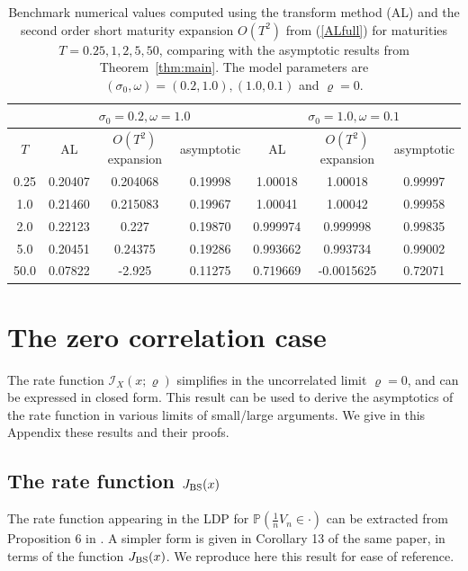 \documentclass[11pt]{article}
\numberwithin{equation}{section}
\theoremstyle{plain}
\begin{document}
\begin{table}
\caption{\label{tab:3} 
Benchmark numerical values computed using the transform method (AL) 
\cite{Lewis2017}
and the second order short maturity expansion $O(T^2)$ from (\ref{ALfull}) 
for maturities $T=0.25, 1, 2, 5, 50$, comparing with the asymptotic results
from Theorem~\ref{thm:main}.
The model parameters are $(\sigma_0,\omega) = (0.2,1.0), (1.0,0.1)$ and 
$\varrho=0$. }
\begin{center}
\begin{tabular}{|c|ccc|ccc|}
\hline
  & \multicolumn{3}{|c|}{$\sigma_0=0.2,\omega=1.0$} 
  & \multicolumn{3}{|c|}{$\sigma_0=1.0,\omega=0.1$} \\
\hline
$T$ & AL & $O(T^2)$ expansion & asymptotic 
    & AL & $O(T^2)$ expansion & asymptotic \\
\hline
\hline
0.25 & 0.20407  & 0.204068 & 0.19998
     & 1.00018  & 1.00018  & 0.99997 \\
1.0  & 0.21460  & 0.215083 & 0.19967
     & 1.00041  &  1.00042 & 0.99958 \\
2.0  & 0.22123 & 0.227 & 0.19870
     & 0.999974 & 0.999998 & 0.99835 \\
5.0  & 0.20451 & 0.24375 & 0.19286
     & 0.993662 & 0.993734 & 0.99002 \\
50.0 & 0.07822 & -2.925 & 0.11275
     & 0.719669 & -0.0015625 & 0.72071 \\
\hline 
\end{tabular}
\end{center}
\end{table}

\appendix

\section{The zero correlation case}
\label{sec:app}

The rate function $\mathcal{I}_X(x;\varrho)$ simplifies in the 
uncorrelated limit $\varrho=0$, and can be expressed
in closed form. This result can be used to derive the asymptotics of the rate 
function in various limits of small/large arguments.
We give in this Appendix these results and their proofs.


\subsection{The rate function $J_{\rm BS}(x)$}

The rate function appearing in the LDP for $\mathbb{P}(\frac{1}{n}V_n\in\cdot)$ 
can be extracted from Proposition 6 in \cite{PZDiscreteAsian}. 
A simpler form is given in Corollary 13 of the same
paper, in terms of the function $J_{\rm BS}(x)$. 
We reproduce here this result for ease of reference.
\end{document}
